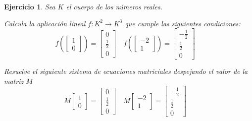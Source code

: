 \documentclass[12pt]{amsart}
\newtheorem{ejer}{Ejercicio}
\begin{document}
\begin{ejer} Sea $K$ el cuerpo de los n\'umeros reales.
\newline
\noindent\begin{minipage}{\textwidth}
\begin{tcolorbox}[colback = green!20!white,title=Versión Aplicación]
Calcula la aplicaci\'on lineal $f:K^{2} \to K^{3}$ que cumple las siguientes condiciones: 
\[f\left(\left[\begin{array}{r}
1 \\
0
\end{array}\right]\right) = \left[\begin{array}{r}
0 \\
\frac{1}{2} \\
0
\end{array}\right] \quad f\left(\left[\begin{array}{r}
-2 \\
1
\end{array}\right]\right) = \left[\begin{array}{r}
-\frac{1}{2} \\
\frac{1}{2} \\
0
\end{array}\right] \quad 
\]\end{tcolorbox}
\end{minipage} \newline
\noindent\begin{minipage}{\textwidth}
\begin{tcolorbox}[colback = blue!20!white,title=Versión Sistema Matricial]
Resuelve el siguiente sistema de ecuaciones matriciales despejando el valor de la matriz $M$
\[M \left[\begin{array}{r}
1 \\
0
\end{array}\right] = \left[\begin{array}{r}
0 \\
\frac{1}{2} \\
0
\end{array}\right] \quad M \left[\begin{array}{r}
-2 \\
1
\end{array}\right] = \left[\begin{array}{r}
-\frac{1}{2} \\
\frac{1}{2} \\
0
\end{array}\right] \quad 
\]\end{tcolorbox}
\end{minipage} \newline

\end{ejer}
\end{document}
